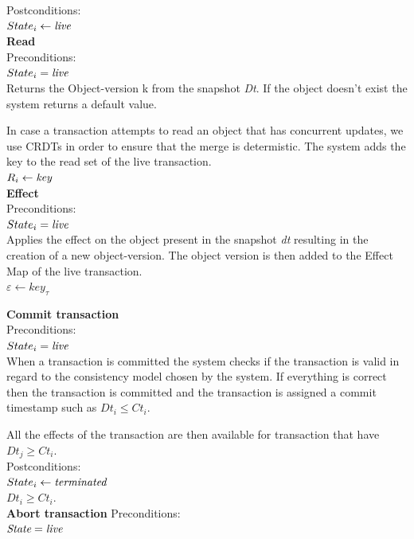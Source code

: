 \documentclass[systeme]{compas2022}
\begin{document}
Postconditions:\\
$State_i \leftarrow \emph{live}$ \\


\textbf{Read}\\
Preconditions:\\ 
$State_i = \emph{live}$ \\

Returns the Object-version k from the snapshot \emph{Dt}. 
If the object doesn't exist the system returns a default value.

In case a transaction attempts to read an object that has concurrent updates, we use CRDTs in order to ensure that the merge is determistic.
The system adds the key to the read set of the live transaction.\\
$R_i \leftarrow \emph{key}$\\

\textbf{Effect}\\
Preconditions:\\ 
$State_i = \emph{live}$ \\

Applies the effect on the object present in the snapshot \emph{dt} resulting in the creation of a new object-version.
The object version is then added to the Effect Map of the live transaction.\\
$\varepsilon \leftarrow key_{\tau}$

\textbf{Commit transaction}\\
Preconditions:\\ 
$State_i = \emph{live}$ \\

When a transaction is committed the system checks if the transaction is valid in regard to the consistency model chosen by the system.
If everything is correct then the transaction is committed and the transaction is assigned a commit timestamp such as $Dt_i \leq Ct_i$.

All the effects of the transaction are then available for transaction that have $Dt_j \geq Ct_i$.\\

Postconditions:\\
$State_i \leftarrow \emph{terminated}$ \\
$Dt_i \geq Ct_i$.\\



\textbf{Abort transaction}
Preconditions:\\ 
$\emph{State} = \emph{live}$ \\
\end{document}
